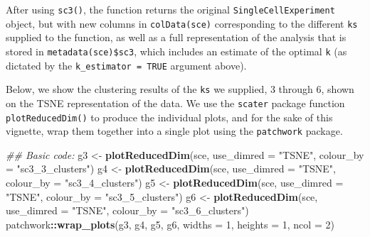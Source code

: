 \documentclass[]{book}
\newenvironment{Shaded}{\begin{snugshade}}{\end{snugshade}}
\newcommand{\CommentTok}[1]{\textcolor[rgb]{0.56,0.35,0.01}{\textit{#1}}}
\newcommand{\DataTypeTok}[1]{\textcolor[rgb]{0.13,0.29,0.53}{#1}}
\newcommand{\DecValTok}[1]{\textcolor[rgb]{0.00,0.00,0.81}{#1}}
\newcommand{\KeywordTok}[1]{\textcolor[rgb]{0.13,0.29,0.53}{\textbf{#1}}}
\newcommand{\NormalTok}[1]{#1}
\newcommand{\OperatorTok}[1]{\textcolor[rgb]{0.81,0.36,0.00}{\textbf{#1}}}
\newcommand{\OtherTok}[1]{\textcolor[rgb]{0.56,0.35,0.01}{#1}}
\newcommand{\StringTok}[1]{\textcolor[rgb]{0.31,0.60,0.02}{#1}}
\begin{document}
\begin{Shaded}
\end{Shaded}

After using \texttt{sc3()}, the function returns the original \texttt{SingleCellExperiment} object, but with new columns in \texttt{colData(sce)} corresponding to the different \texttt{ks} supplied to the function, as well as a full representation of the analysis that is stored in \texttt{metadata(sce)\$sc3}, which includes an estimate of the optimal \texttt{k} (as dictated by the \texttt{k\_estimator\ =\ TRUE} argument above).

Below, we show the clustering results of the \texttt{ks} we supplied, 3 through 6, shown on the TSNE representation of the data. We use the \texttt{scater} package function \texttt{plotReducedDim()} to produce the individual plots, and for the sake of this vignette, wrap them together into a single plot using the \texttt{patchwork} package.

\begin{Shaded}
\begin{Highlighting}[]
\CommentTok{## Basic code:}
\NormalTok{g3 <-}\StringTok{ }\KeywordTok{plotReducedDim}\NormalTok{(sce, }\DataTypeTok{use_dimred =} \StringTok{"TSNE"}\NormalTok{, }\DataTypeTok{colour_by =} \StringTok{"sc3_3_clusters"}\NormalTok{)}
\NormalTok{g4 <-}\StringTok{ }\KeywordTok{plotReducedDim}\NormalTok{(sce, }\DataTypeTok{use_dimred =} \StringTok{"TSNE"}\NormalTok{, }\DataTypeTok{colour_by =} \StringTok{"sc3_4_clusters"}\NormalTok{)}
\NormalTok{g5 <-}\StringTok{ }\KeywordTok{plotReducedDim}\NormalTok{(sce, }\DataTypeTok{use_dimred =} \StringTok{"TSNE"}\NormalTok{, }\DataTypeTok{colour_by =} \StringTok{"sc3_5_clusters"}\NormalTok{)}
\NormalTok{g6 <-}\StringTok{ }\KeywordTok{plotReducedDim}\NormalTok{(sce, }\DataTypeTok{use_dimred =} \StringTok{"TSNE"}\NormalTok{, }\DataTypeTok{colour_by =} \StringTok{"sc3_6_clusters"}\NormalTok{)}
\NormalTok{patchwork}\OperatorTok{::}\KeywordTok{wrap_plots}\NormalTok{(g3, g4, g5, g6, }\DataTypeTok{widths =} \DecValTok{1}\NormalTok{, }\DataTypeTok{heights =} \DecValTok{1}\NormalTok{, }\DataTypeTok{ncol =} \DecValTok{2}\NormalTok{)}
\end{Highlighting}
\end{Shaded}
\end{document}
